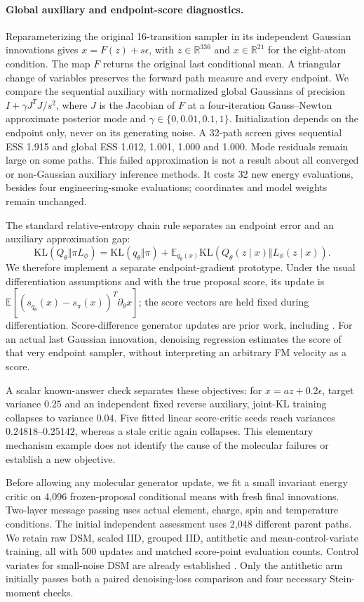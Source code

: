 \paragraph{Global auxiliary and endpoint-score diagnostics.}
Reparameterizing the original 16-transition sampler in its independent Gaussian
innovations gives $x=F(z)+s\epsilon$, with $z\in\mathbb R^{336}$ and
$x\in\mathbb R^{21}$ for the eight-atom condition. The map $F$ returns the
original last conditional mean. A triangular change of variables preserves the
forward path measure and every endpoint. We compare the sequential auxiliary
with normalized global Gaussians of precision $I+\gamma J^TJ/s^2$, where $J$
is the Jacobian of $F$ at a four-iteration Gauss--Newton approximate posterior
mode and $\gamma\in\{0,0.01,0.1,1\}$. Initialization depends on the endpoint
only, never on its generating noise. A 32-path screen gives sequential ESS
1.915 and global ESS 1.012, 1.001, 1.000 and 1.000. Mode residuals remain large
on some paths. This failed approximation is not a result about all converged
or non-Gaussian auxiliary inference methods. It costs 32 new energy evaluations,
besides four engineering-smoke evaluations; coordinates and model weights
remain unchanged.

The standard relative-entropy chain rule separates an endpoint error and an
auxiliary approximation gap:
\[
\mathrm{KL}(Q_\theta\Vert\pi L_\phi)
=\mathrm{KL}(q_\theta\Vert\pi)
+\mathbb E_{q_\theta(x)}\mathrm{KL}(Q_\theta(z\mid x)\Vert L_\phi(z\mid x)).
\]
We therefore implement a separate endpoint-gradient prototype. Under the usual
differentiation assumptions and with the true proposal score, its update is
$\mathbb E[(s_{q_\theta}(x)-s_\pi(x))^T\partial_\theta x]$; the score vectors
are held fixed during differentiation. Score-difference generator updates
are prior work, including \citet{yin2024dmd}. For an actual last Gaussian
innovation, denoising regression estimates the score of that very endpoint
sampler, without interpreting an arbitrary FM velocity as a score.

A scalar known-answer check separates these objectives: for
$x=az+0.2\epsilon$, target variance $0.25$ and an independent fixed reverse
auxiliary, joint-KL training collapses to variance $0.04$. Five fitted linear
score-critic seeds reach variances $0.24818$--$0.25142$, whereas a stale critic
again collapses. This elementary mechanism example does not identify the cause
of the molecular failures or establish a new objective.

Before allowing any molecular generator update, we fit a small invariant energy
critic on 4,096 frozen-proposal conditional means with fresh final innovations.
Two-layer message passing uses actual element, charge, spin and temperature
conditions. The initial independent assessment uses 2,048 different parent paths.
We retain raw DSM, scaled IID, grouped IID, antithetic and mean-control-variate
training, all with 500 updates and matched score-point evaluation counts.
Control variates for small-noise DSM are already established
\citep{birrell2025ndsm}. Only the antithetic arm initially passes both a paired
denoising-loss comparison and four necessary Stein-moment checks.

